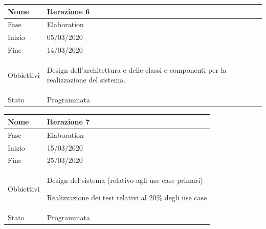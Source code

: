 \begin{center}
\begin{tabular}{ |p{2cm}|p{10cm}|  }
\hline
Nome & Iterazione 6 \\\hline
Fase & Elaboration \\\hline
Inizio & 05/03/2020 \\\hline
Fine &  14/03/2020  \\\hline
Obbiettivi & 
	\begin{compactitem}
		\item Design dell'architettura e delle classi e componenti per la realizzazione del sistema.
		
	\end{compactitem}\\\hline
Stato &  Programmata \\\hline
\end{tabular}
\label{table:6}\newline

\begin{tabular}{ |p{2cm}|p{10cm}|  }
\hline
Nome & Iterazione 7 \\\hline
Fase & Elaboration \\\hline
Inizio & 15/03/2020 \\\hline
Fine & 25/03/2020 \\\hline
Obbiettivi & 
	\begin{compactitem}
		\item Design del sistema (relativo agli use case primari)
		\item Realizzazione dei test relativi al 20\% degli use case
	\end{compactitem}\\\hline
Stato &  Programmata \\\hline
\end{tabular}
\label{table:7}\newline


\end{center}
